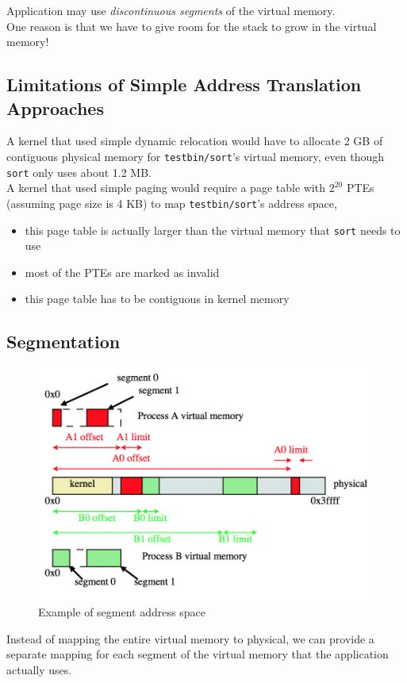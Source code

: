 \documentclass[12pt]{article}
\theoremstyle{plain}
\theoremstyle{definition}
\begin{document}
Application may use \emph{discontinuous segments} of the virtual memory. \\
One reason is that we have to give room for the stack to grow in the virtual memory!

\subsection{Limitations of Simple Address Translation Approaches}
A kernel that used simple dynamic relocation would have to allocate 2 GB of contiguous physical memory for \texttt{testbin/sort}'s virtual memory, even though \texttt{sort} only uses about 1.2 MB. \\

A kernel that used simple paging would require a page table with $2^{20}$ PTEs (assuming page size is 4 KB) to map \texttt{testbin/sort}'s address space,
\begin{itemize}
  \item this page table is actually larger than the virtual memory that \texttt{sort} needs to use
  \item most of the PTEs are marked as invalid
  \item this page table has to be contiguous in kernel memory
\end{itemize}

\subsection{Segmentation}
\begin{figure}[ht]
  \centering
  \includegraphics[scale=0.7]{pictures/seg_addr_space.png}
  \caption{Example of segment address space}
  \label{fig:seg_addr_space}
\end{figure}
Instead of mapping the entire virtual memory to physical, we can provide a separate mapping for each segment of the virtual memory that the application actually uses. \\
\end{document}
